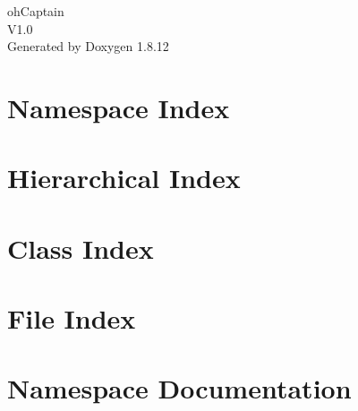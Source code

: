 \documentclass[twoside]{book}
\newcommand{\+}{\discretionary{\mbox{\scriptsize$\hookleftarrow$}}{}{}}
\newcommand{\clearemptydoublepage}{%
  \newpage{\pagestyle{empty}\cleardoublepage}%
}
\begin{document}
\hypersetup{pageanchor=false,
             bookmarksnumbered=true,
             pdfencoding=unicode
            }
\begin{titlepage}
\vspace*{7cm}
\begin{center}%
{\Large oh\+Captain \\[1ex]\large V1.\+0 }\\
\vspace*{1cm}
{\large Generated by Doxygen 1.8.12}\\
\end{center}
\end{titlepage}
\clearemptydoublepage
{}
\tableofcontents
\clearemptydoublepage
{}
\hypersetup{pageanchor=true}

\chapter{Namespace Index}

\chapter{Hierarchical Index}

\chapter{Class Index}

\chapter{File Index}

\chapter{Namespace Documentation}







\end{document}
